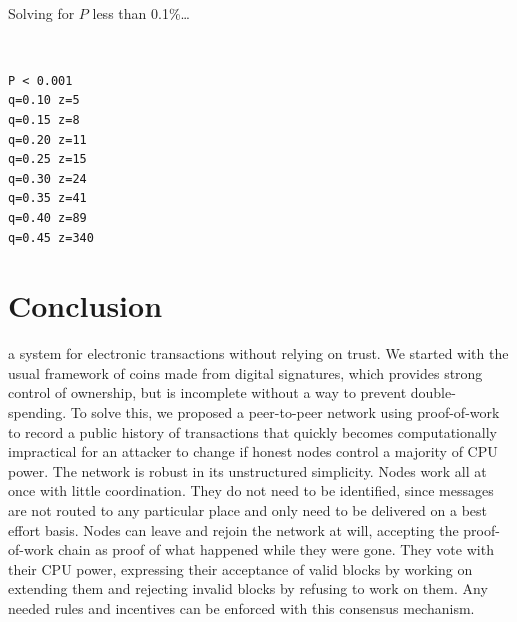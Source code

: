 \documentclass[nohyper]{tufte-handout}
\begin{document}
\

Solving for $P$ less than 0.1\%\ldots{}

\

\begin{verbatim}
P < 0.001
q=0.10 z=5
q=0.15 z=8
q=0.20 z=11
q=0.25 z=15
q=0.30 z=24
q=0.35 z=41
q=0.40 z=89
q=0.45 z=340
\end{verbatim}


\section{Conclusion}\label{conclusion}

 a system for electronic transactions without relying on
trust. We started with the usual framework of coins made from digital
signatures, which provides strong control of ownership, but is
incomplete without a way to prevent double-spending. To solve this, we
proposed a peer-to-peer network using proof-of-work to record a public
history of transactions that quickly becomes computationally impractical
for an attacker to change if honest nodes control a majority of CPU
power. The network is robust in its unstructured simplicity. Nodes work
all at once with little coordination. They do not need to be identified,
since messages are not routed to any particular place and only need to
be delivered on a best effort basis. Nodes can leave and rejoin the
network at will, accepting the proof-of-work chain as proof of what
happened while they were gone. They vote with their CPU power,
expressing their acceptance of valid blocks by working on extending them
and rejecting invalid blocks by refusing to work on them. Any needed
rules and incentives can be enforced with this consensus mechanism.



\end{document}
